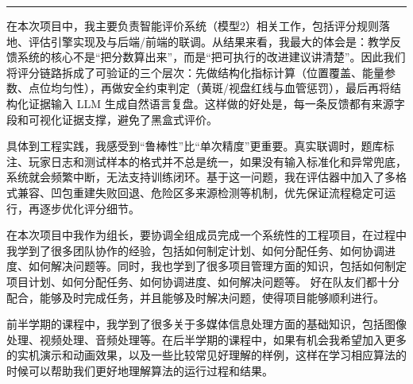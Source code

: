 \documentclass[12pt,a4paper]{ctexart}
\newcommand{\templaterule}{
  \noindent\color{linegray}\rule{\textwidth}{0.5pt}\color{black}
}
\begin{document}
\vspace{1em}
\templaterule
\vspace{1em}

\par
\vspace{0.6em}

在本次项目中，我主要负责智能评价系统（模型2）相关工作，包括评分规则落地、评估引擎实现及与后端/前端的联调。从结果来看，我最大的体会是：教学反馈系统的核心不是“把分数算出来”，而是“把可执行的改进建议讲清楚”。因此我们将评分链路拆成了可验证的三个层次：先做结构化指标计算（位置覆盖、能量参数、点位均匀性），再做安全约束判定（黄斑/视盘红线与血管惩罚），最后再将结构化证据输入 LLM 生成自然语言复盘。这样做的好处是，每一条反馈都有来源字段和可视化证据支撑，避免了黑盒式评价。

具体到工程实践，我感受到“鲁棒性”比“单次精度”更重要。真实联调时，题库标注、玩家日志和测试样本的格式并不总是统一，如果没有输入标准化和异常兜底，系统就会频繁中断，无法支持训练闭环。基于这一问题，我在评估器中加入了多格式兼容、凹包重建失败回退、危险区多来源检测等机制，优先保证流程稳定可运行，再逐步优化评分细节。

在本次项目中我作为组长，要协调全组成员完成一个系统性的工程项目，在过程中我学到了很多团队协作的经验，包括如何制定计划、如何分配任务、如何协调进度、如何解决问题等。同时，我也学到了很多项目管理方面的知识，包括如何制定项目计划、如何分配任务、如何协调进度、如何解决问题等。 好在队友们都十分配合，能够及时完成任务，并且能够及时解决问题，使得项目能够顺利进行。

前半学期的课程中，我学到了很多关于多媒体信息处理方面的基础知识，包括图像处理、视频处理、音频处理等。在后半学期的课程中，如果有机会我希望加入更多的实机演示和动画效果，以及一些比较常见好理解的样例，这样在学习相应算法的时候可以帮助我们更好地理解算法的运行过程和结果。
\end{document}
